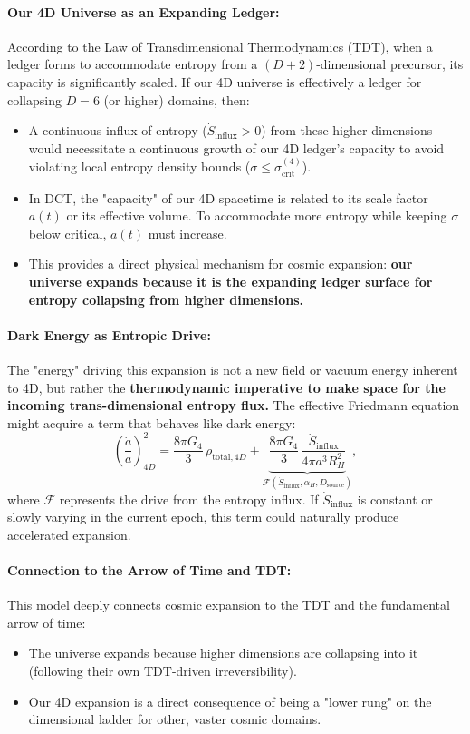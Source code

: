 \documentclass[a4paper, 12pt, oneside]{book}
\numberwithin{equation}{chapter}
\begin{document}
\paragraph{Our 4D Universe as an Expanding Ledger:}
According to the Law of Transdimensional Thermodynamics (TDT), when a ledger forms to accommodate entropy from a $(D+2)$-dimensional precursor, its capacity is significantly scaled. If our 4D universe is effectively a ledger for collapsing \(D=6\) (or higher) domains, then:
\begin{itemize}
    \item A continuous influx of entropy ($\dot{S}_{\text{influx}} > 0$) from these higher dimensions would necessitate a continuous growth of our 4D ledger's capacity to avoid violating local entropy density bounds ($\sigma \le \sigma_{\text{crit}}^{(4)}$).
    \item In DCT, the "capacity" of our 4D spacetime is related to its scale factor $a(t)$ or its effective volume. To accommodate more entropy while keeping $\sigma$ below critical, $a(t)$ must increase.
    \item This provides a direct physical mechanism for cosmic expansion: \textbf{our universe expands because it is the expanding ledger surface for entropy collapsing from higher dimensions.}
\end{itemize}

\paragraph{Dark Energy as Entropic Drive:}
The "energy" driving this expansion is not a new field or vacuum energy inherent to 4D, but rather the \textbf{thermodynamic imperative to make space for the incoming trans-dimensional entropy flux.} The effective Friedmann equation might acquire a term that behaves like dark energy:
\[
  \left(\frac{\dot a}{a}\right)^2_{4D}
  = \frac{8\pi G_4}{3}\,\rho_{\text{total},4D}
  + \underbrace{\frac{8\pi G_4}{3}\,
      \frac{\dot S_{\text{influx}}}{4\pi a^{3} R_H^{2}}
      }_{\displaystyle
      \mathcal F(\dot S_{\text{influx}},\alpha_H,D_{\text{source}})},
\]
where $\mathcal{F}$ represents the drive from the entropy influx. If $\dot{S}_{\text{influx}}$ is constant or slowly varying in the current epoch, this term could naturally produce accelerated expansion.

\paragraph{Connection to the Arrow of Time and TDT:}
This model deeply connects cosmic expansion to the TDT and the fundamental arrow of time:
\begin{itemize}
    \item The universe expands because higher dimensions are collapsing into it (following their own TDT-driven irreversibility).
    \item Our 4D expansion is a direct consequence of being a "lower rung" on the dimensional ladder for other, vaster cosmic domains.
\end{itemize}
\end{document}
